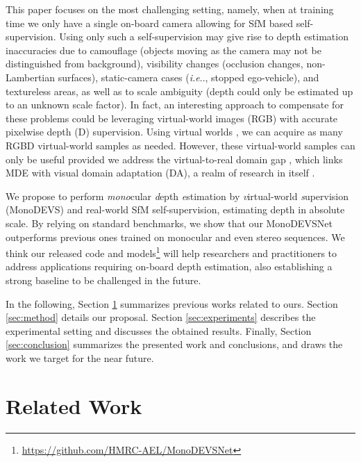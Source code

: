 \documentclass[journal]{IEEEtran}
\makeatletter
\DeclareRobustCommand\onedot{\futurelet\@let@token\@onedot}
\def\@onedot{\ifx\@let@token.\else.\null\fi\xspace}
\def\ie{\emph{i.e}\onedot} \def\Ie{\emph{I.e}\onedot}
\makeatother
\begin{document}
This paper focuses on the most challenging setting, namely, when at training time we only have a single on-board camera allowing for SfM based self-supervision. Using only such a self-supervision may give rise to depth estimation inaccuracies due to camouflage (objects moving as the camera may not be distinguished from background), visibility changes (occlusion changes, non-Lambertian surfaces), static-camera cases ({\ie}, stopped ego-vehicle), and textureless areas, as well as to scale ambiguity (depth could only be estimated up to an unknown scale factor). In fact, an interesting approach to compensate for these problems could be leveraging virtual-world images (RGB) with accurate pixelwise depth (D) supervision. Using virtual worlds \cite{Gaidon:2016, Cabon:2020, Ros:2016, Mayer:2016, Richter:2017, Shah:2017, Dosovitskiy:2017}, we can acquire as many RGBD virtual-world samples as needed. However, these virtual-world samples can only be useful provided we address the virtual-to-real domain gap \cite{Zheng:2018T2Net, Kundu:2018AdaDepth, Zhao:2019GASDA, Pnvr:2020SharinGAN, Cheng:2020S3Net}, which links MDE with visual domain adaptation (DA), a realm of research in itself \cite{Csurka:2017, Wang-Deng:2018, Wilson:2020}.

We propose to perform \emph{mono}cular \emph{d}epth \emph{e}stimation by \emph{v}irtual-world \emph{s}upervision (MonoDEVS) and real-world SfM self-supervision, estimating depth in absolute scale. By relying on standard benchmarks, we show that our MonoDEVSNet outperforms previous ones trained on monocular and even stereo sequences. 
We think our released code and models\footnote{\href{https://github.com/HMRC-AEL/MonoDEVSNet}{https://github.com/HMRC-AEL/MonoDEVSNet}} will help researchers and practitioners to address applications requiring on-board depth estimation, also establishing a strong baseline to be challenged in the future.


In the following, Section \ref{sec:relatedwork} summarizes previous works related to ours. Section \ref{sec:method} details our proposal. Section \ref{sec:experiments} describes the experimental setting and discusses the obtained results. Finally, Section \ref{sec:conclusion} summarizes the presented work and conclusions, and draws the work we target for the near future.

\section{Related Work}
\label{sec:relatedwork}
\end{document}
